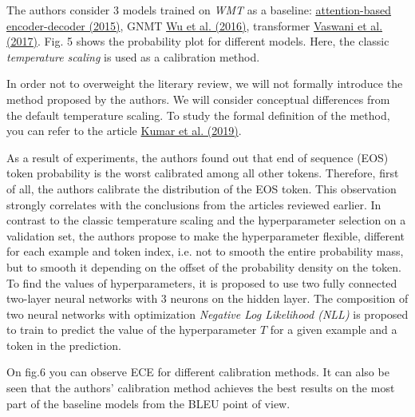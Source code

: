 \documentclass[a4paper,14pt]{extarticle}
\newcommand{\bibref}[3]{\hyperlink{#1}{#2 (#3)}}
\begin{document}
	The authors consider 3 models trained on \textit{WMT} as a baseline: \bibref{encdec_att}{attention-based encoder-decoder}{2015}, GNMT \bibref{gnmt}{Wu et al.}{2016}, transformer \bibref{transformer}{Vaswani et al.}{2017}. Fig. 5 shows the probability plot for different models. Here, the classic \textit{temperature scaling} is used as a calibration method.
	
	In order not to overweight the literary review, we will not formally introduce the method proposed by the authors. We will consider conceptual differences from the default temperature scaling. To study the formal definition of the method, you can refer to the article \bibref{calibration}{Kumar et al.}{2019}.
	
	As a result of experiments, the authors found out that end of sequence (EOS) token probability is the worst calibrated among all other tokens. Therefore, first of all, the authors calibrate the distribution of the EOS token. This observation strongly correlates with the conclusions from the articles reviewed earlier. In contrast to the classic temperature scaling and the hyperparameter selection on a validation set, the authors propose to make the hyperparameter flexible, different for each example and token index, i.e. not to smooth the entire probability mass, but to smooth it depending on the offset of the probability density on the token. To find the values of hyperparameters, it is proposed to use two fully connected two-layer neural networks with 3 neurons on the hidden layer. The composition of two neural networks with optimization \textit{Negative Log Likelihood (NLL)} is proposed to train to predict the value of the hyperparameter $T$ for a given example and a token in the prediction.
	
	On fig.6 you can observe ECE for different calibration methods. It can also be seen that the authors' calibration method achieves the best results on the most part of the baseline models from the BLEU point of view.
	
	\begin{figure}[t]
	\end{figure}
	
\end{document}
